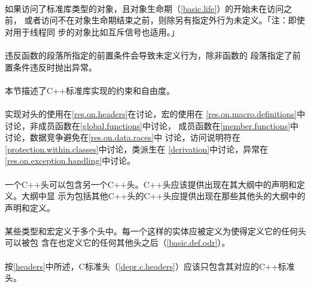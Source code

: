 \paragraph{}
如果访问了标准库类型的对象，且对象生命期（\ref{basic.life}）的开始未在访问之前，
或者访问不在对象生命期结束之前，则除另有指定外行为未定义。「注：即使对用于线程同
步的对象比如互斥信号也适用。」

\paragraph{}
违反函数的段落所指定的前置条件会导致未定义行为，除非函数的
段落指定了前置条件违反时抛出异常。

\paragraph{}
本节描述了C++标准库实现的约束和自由度。

\paragraph{}
实现对头的使用在\ref{res.on.headers}在讨论，宏的使用在
\ref{res.on.macro.definitions}中讨论，非成员函数在\ref{global.functions}中讨论，
成员函数在\ref{member.functions}中讨论，数据竞争避免在\ref{res.on.data.races}中
讨论，访问说明符在\ref{protection.within.classes}中讨论，类派生在
\ref{derivation}中讨论，异常在\ref{res.on.exception.handling}中讨论。

\paragraph{}
一个C++头可以包含另一个C++头。C++头应该提供出现在其大纲中的声明和定义。大纲中显
示为包括其他C++头的C++头应提供出现在那些其他头的大纲中的声明和定义。

\paragraph{}
某些类型和宏定义于多个头中。每一个这样的实体应被定义为使得定义它的任何头可以被包
含在也定义它的任何其他头之后（\ref{basic.def.odr}）。

\paragraph{}
按\ref{headers}中所述，C标准头（\ref{depr.c.headers}）应该只包含其对应的C++标准
头。

